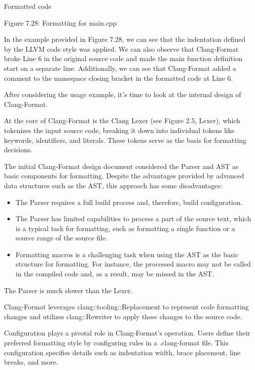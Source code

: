 Formatted code

\begin{center}
Figure 7.28: Formatting for main.cpp
\end{center}

In the example provided in Figure 7.28, we can see that the indentation defined by the LLVM code style was applied. We can also observe that Clang-Format broke Line 6 in the original source code and made the main function definition start on a separate line. Additionally, we can see that Clang-Format added a comment to the namespace closing bracket in the formatted code at Line 6.

After considering the usage example, it’s time to look at the internal design of Clang-Format.


At the core of Clang-Format is the Clang Lexer (see Figure 2.5, Lexer), which tokenizes the input source code, breaking it down into individual tokens like keywords, identifiers, and literals. These tokens serve as the basis for formatting decisions.

The initial Clang-Format design document considered the Parser and AST as basic components for formatting. Despite the advantages provided by advanced data structures such as the AST, this approach has some disadvantages:

\begin{itemize}
\item
The Parser requires a full build process and, therefore, build configuration.

\item
The Parser has limited capabilities to process a part of the source text, which is a typical task for formatting, such as formatting a single function or a source range of the source file.

\item
Formatting macros is a challenging task when using the AST as the basic structure for formatting. For instance, the processed macro may not be called in the compiled code and, as a result, may be missed in the AST.
\end{itemize}

The Parser is much slower than the Lexer.

Clang-Format leverages clang::tooling::Replacement to represent code formatting changes and utilizes clang::Rewriter to apply these changes to the source code.

Configuration plays a pivotal role in Clang-Format’s operation. Users define their preferred formatting style by configuring rules in a .clang-format file. This configuration specifies details such as indentation width, brace placement, line breaks, and more.

